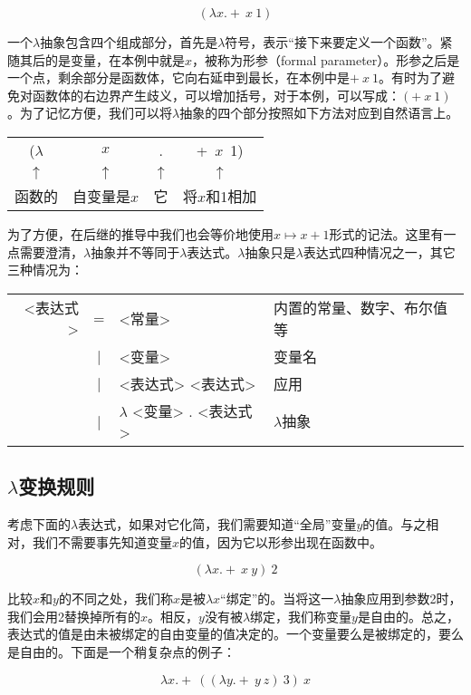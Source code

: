 \documentclass[b5paper]{ctexart}
\begin{document}
\[
(\lambda x . +\ x\ 1)
\]

一个$\lambda$抽象包含四个组成部分，首先是$\lambda$符号，表示“接下来要定义一个函数”。紧随其后的是变量，在本例中就是$x$，被称为形参（formal parameter）。形参之后是一个点，剩余部分是函数体，它向右延申到最长，在本例中是$+\ x\ 1$。有时为了避免对函数体的右边界产生歧义，可以增加括号，对于本例，可以写成：$(+\ x\ 1)$。为了记忆方便，我们可以将$\lambda$抽象的四个部分按照如下方法对应到自然语言上。

\begin{tabular}{cccc}
($\lambda$ & $x$ & . & +\  $x$\ 1) \\
$\uparrow$ & $\uparrow$ & $\uparrow$ & $\uparrow$ \\
函数的 & 自变量是$x$ & 它 & 将$x$和1相加 \\
\end{tabular}

为了方便，在后继的推导中我们也会等价地使用$x \mapsto x + 1$形式的记法。这里有一点需要澄清，$\lambda$抽象并不等同于$\lambda$表达式。$\lambda$抽象只是$\lambda$表达式四种情况之一，其它三种情况为：

\begin{adjustbox}{max width=\textwidth}
\begin{tabular}{rcll}
<表达式> & = & <常量> & 内置的常量、数字、布尔值等 \\
        & | & <变量> & 变量名 \\
        & | & <表达式> <表达式> & 应用 \\
        & | & $\lambda$ <变量> . <表达式> & $\lambda$抽象
\end{tabular}
\end{adjustbox}

\subsection{\texorpdfstring{$\lambda$}{λ}变换规则}

考虑下面的$\lambda$表达式，如果对它化简，我们需要知道“全局”变量$y$的值。与之相对，我们不需要事先知道变量$x$的值，因为它以形参出现在函数中。

\[
(\lambda x . +\ x\ y)\ 2
\]

比较$x$和$y$的不同之处，我们称$x$是被$\lambda x$“绑定”的。当将这一$\lambda$抽象应用到参数2时，我们会用2替换掉所有的$x$。相反，$y$没有被$\lambda$绑定，我们称变量$y$是自由的。总之，表达式的值是由未被绑定的自由变量的值决定的。一个变量要么是被绑定的，要么是自由的。下面是一个稍复杂点的例子：

\[
\lambda x . +\ ((\lambda y . +\ y\ z)\ 3)\ x
\]
\end{document}

